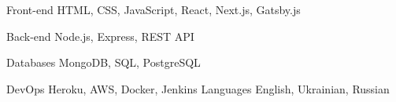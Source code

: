 

\begin{cvskills}

  \cvskill
    {Front-end} %
    {HTML, CSS, JavaScript, React, Next.js, Gatsby.js } %

  \cvskill
    {Back-end} %
    {Node.js, Express, REST API} %

  \cvskill
    {Databases} %
    {MongoDB, SQL, PostgreSQL} %

  \cvskill
    {DevOps} %
    {Heroku, AWS, Docker, Jenkins} %
  \cvskill
    {Languages} %
    {English, Ukrainian, Russian} %

\end{cvskills}
